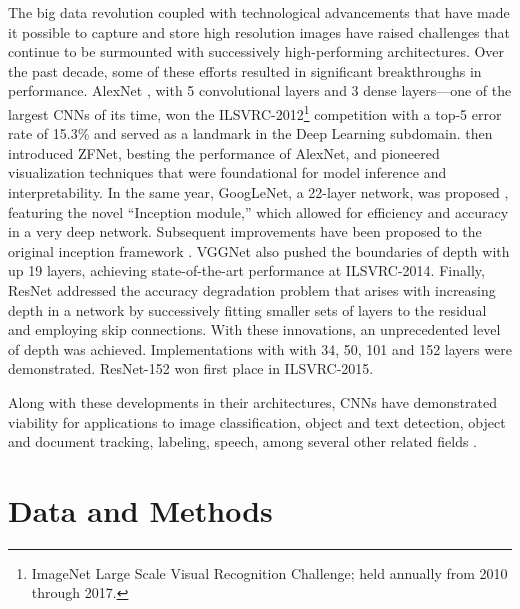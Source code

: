 \documentclass[Journal,letterpaper, SingleSpace, InsideFigs]{ascelike-new}
\begin{document}
The big data revolution coupled with technological advancements that have made it possible to capture and store high resolution images have raised challenges that continue to be surmounted with successively high-performing
architectures. Over the past decade, some of these efforts resulted in significant breakthroughs in performance. AlexNet \cite{krizhevsky2012imageneta}, with 5 convolutional layers and 3 dense layers---one of the largest CNNs of its time, won the ILSVRC-2012\footnote{ImageNet Large Scale Visual Recognition Challenge; held annually from 2010 through 2017.} competition with a top-5 error rate of 15.3\% and served as a landmark in the Deep Learning subdomain.  then introduced ZFNet, besting the performance of AlexNet, and pioneered visualization techniques that were foundational for model inference and interpretability.  In the same year, GoogLeNet, a 22-layer network, was proposed \cite{szegedy2014going}, featuring the novel ``Inception module,'' which allowed for efficiency and accuracy in a very deep network. Subsequent improvements have been proposed to the original inception framework \cite{szegedy2015rethinking,szegedy2016inceptionv4}.  VGGNet \cite{simonyan2015very} also pushed the boundaries of depth with up 19 layers, achieving state-of-the-art performance at ILSVRC-2014. Finally, ResNet \cite{he2015deep} addressed the accuracy degradation problem that arises with increasing depth in a network by successively fitting smaller sets of layers to the residual and employing skip connections. With these innovations, an unprecedented level of depth was achieved. Implementations with with 34, 50, 101 and 152 layers were demonstrated. ResNet-152 won first place in ILSVRC-2015.

Along with these developments in their architectures, CNNs have demonstrated viability for applications to image
classification, object and text detection, object and document tracking, labeling, speech, among several other related
fields \cite{gu2018recent}. %


\section{Data and Methods}
\end{document}
